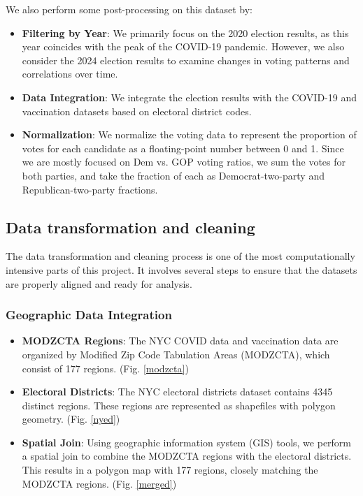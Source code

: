 \documentclass[10pt,journal,compsoc]{IEEEtran}
\begin{document}
We also perform some post-processing on this dataset by:
\begin{itemize}
    \item \textbf{Filtering by Year}: We primarily focus on the 2020 election results, as this year coincides with the peak of the COVID-19 pandemic. However, we also consider the 2024 election results to examine changes in voting patterns and correlations over time.
    \item \textbf{Data Integration}: We integrate the election results with the COVID-19 and vaccination datasets based on electoral district codes.
    \item \textbf{Normalization}: We normalize the voting data to represent the proportion of votes for each candidate as a floating-point number between 0 and 1. Since we are mostly focused on Dem vs. GOP voting ratios, we sum the votes for both parties, and take the fraction of each as Democrat-two-party and Republican-two-party fractions.
\end{itemize}

\subsection{Data transformation and cleaning}

The data transformation and cleaning process is one of the most computationally intensive parts of this project. It involves several steps to ensure that the datasets are properly aligned and ready for analysis.

\subsubsection{Geographic Data Integration}
\begin{itemize}
    \item \textbf{MODZCTA Regions}: The NYC COVID data and vaccination data are organized by Modified Zip Code Tabulation Areas (MODZCTA), which consist of 177 regions. (Fig. \ref{modzcta})
    \item \textbf{Electoral Districts}: The NYC electoral districts dataset contains 4345 distinct regions. These regions are represented as shapefiles with polygon geometry. (Fig. \ref{nyed})
    \item \textbf{Spatial Join}: Using geographic information system (GIS) tools, we perform a spatial join to combine the MODZCTA regions with the electoral districts. This results in a polygon map with 177 regions, closely matching the MODZCTA regions. (Fig. \ref{merged})
\end{itemize}
\end{document}
